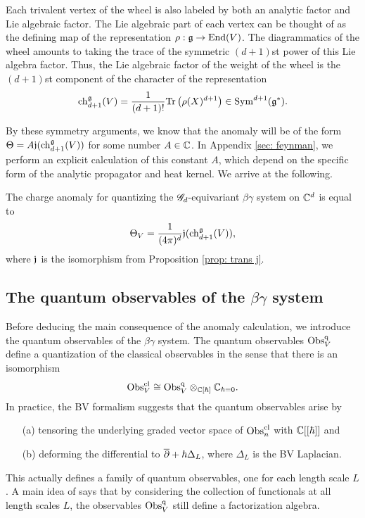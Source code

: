 Each trivalent vertex of the wheel is also labeled by both an analytic factor and Lie algebraic factor. 
The Lie algebraic part of each vertex can be thought of as the defining map of the representation $\rho : \mathfrak g \to {\rm End}(V)$. 
The diagrammatics of the wheel amounts to taking the trace of the symmetric $(d+1)$st power of this Lie algebra factor. 
Thus, the Lie algebraic factor of the weight of the wheel is the $(d+1)$st component of the character of the representation
\[
{\rm ch}_{d+1}^\mathfrak g(V) = \frac{1}{(d+1)!} {\rm Tr}\left(\rho(X)^{d+1}\right) \in {\rm Sym}^{d+1}(\mathfrak g^*) .
\]

By these symmetry arguments, we know that the anomaly will be of the form $\Theta = A \mathfrak j ({\rm ch}_{d+1}^{\mathfrak g}(V))$ for some number $A \in \mathbb C$.
In Appendix \ref{sec: feynman}, we perform an explicit calculation of this constant $A$, which depend on the specific form of the analytic propagator and heat kernel. 
We arrive at the following.

\begin{prop}\label{prop: bg anomaly}
The charge anomaly for quantizing the $\mathscr G_d$-equivariant $\beta\gamma$ system on $\mathbb C^d$ is equal to
\[
\Theta_V = \frac{1}{(4 \pi)^d} \mathfrak j ({\rm ch}_{d+1}^{\mathfrak g}(V)),
\]
where $\mathfrak j$ is the isomorphism from Proposition \ref{prop: trans j}.
\end{prop}

\subsection{The quantum observables of the $\beta\gamma$ system}

Before deducing the main consequence of the anomaly calculation, we introduce the quantum observables of the $\beta\gamma$ system. 
The quantum observables ${\rm Obs}^{{\rm q}}_V$ define a quantization of the classical observables in the sense that there is an isomorphism
\[
{\rm Obs}^{{\rm cl}}_V \cong {\rm Obs}^{\rm q}_V \otimes_{\mathbb C[\hbar]} \mathbb C_{\hbar = 0} .
\]
In practice, the BV formalism suggests that the quantum observables arise by 
\begin{enumerate}
\item[(a)] tensoring the underlying graded vector space of ${\rm Obs}^{\rm cl}_n$ with $\mathbb C[[\hbar]]$ and
\item[(b)] deforming the differential to $\overline{\partial} +\hbar \Delta_L$, where $\Delta_L$ is the BV Laplacian.
\end{enumerate}
This actually defines a family of quantum observables, one for each length scale $L$. 
A main idea of \cite{CG2} says that by considering the collection of functionals at all length scales $L$, the observables ${\rm Obs}^{\rm q}_V$ still define a factorization algebra. 

